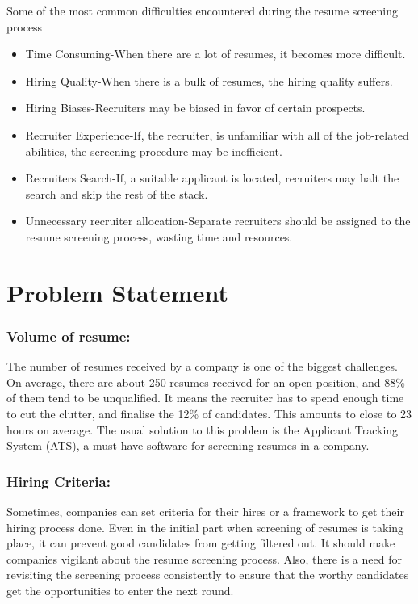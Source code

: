 \documentclass[12 pt, oneside]{book}
\begin{document}
Some of the most common difficulties encountered 
during the resume screening process
\begin{itemize}
    \item {Time Consuming-When there are a lot of resumes, it 
becomes more difficult.}
    \item{Hiring Quality-When there is a bulk of resumes, the
hiring quality suffers.}
    \item{Hiring Biases-Recruiters may be biased in favor of 
certain prospects.
}
    \item{Recruiter Experience-If, the recruiter, is unfamiliar 
with all of the job-related abilities, the screening 
procedure may be inefficient.}
    \item{Recruiters Search-If, a suitable applicant is located, 
recruiters may halt the search and skip the rest of the 
stack.
}
    \item{Unnecessary recruiter allocation-Separate recruiters 
should be assigned to the resume screening process, 
wasting time and resources.}
\end{itemize}


\section{Problem Statement}
\subsubsection{Volume of resume:}
The number of resumes received by a company is one of the biggest challenges. On average, there are about 250 resumes received for an open position, and 88\% of them tend to be unqualified. It means the recruiter has to spend enough time to cut the clutter, and finalise the 12\% of candidates. This amounts to close to 23 hours on average. The usual solution to this problem is the Applicant Tracking System (ATS), a must-have software for screening resumes in a company.

\subsubsection{Hiring Criteria:}
Sometimes, companies can set criteria for their hires or a framework to get their hiring process done. Even in the initial part when screening of resumes is taking place, it can prevent good candidates from getting filtered out. It should make companies vigilant about the resume screening process. Also, there is a need for revisiting the screening process consistently to ensure that the worthy candidates get the opportunities to enter the next round.
\end{document}
